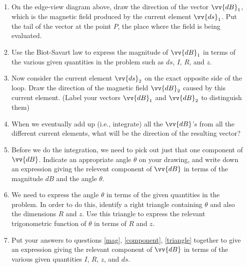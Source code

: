 \begin{enumerate}[leftmargin=0in, labelwidth=*, align=left, labelsep=0in, widest=a, itemindent=\labelwidth, label=(\emph{\alph*})]
\item On the edge-view diagram above, draw the direction of the vector $\vv{dB}_1$,
which is the magnetic field produced by the current element $\vv{ds}_1$.  Put the
tail of the vector at the point $P$, the place where the field
is being evaluated.  

\item \label{mag}
Use the Biot-Savart law to express the magnitude of $\vv{dB}_1$
in terms of the various given quantities in the problem such as $ds$, $I$,
$R$, and $z$.
\answerspace{0.7in}

\item Now consider the current element $\vv{ds}_2$ on the exact opposite
side of the loop.  Draw the direction of the magnetic field $\vv{dB}_2$
caused by this current element.  (Label your vectors $\vv{dB}_1$ and $\vv{dB}_2$ 
to distinguish them)

\item When we eventually add up (i.e., integrate) all the $\vv{dB}$'s from
all the different current elements, what will be the direction of  
the resulting
vector?
\answerspace{0.5in}

\item \label{component}
Before we do the integration, we need to pick out just that
one component of $\vv{dB}$.  Indicate an appropriate angle $\theta$
on your drawing, and write down an expression giving the
relevent component of $\vv{dB}$ in terms of the magnitude
$dB$ and the angle $\theta$.
\answerspace{0.5in}

\item \label{triangle}
We need to express the angle $\theta$ in terms of the given
quantities in the problem.  In order to do this, identify a right
triangle containing $\theta$ and also the dimensions $R$ and $z$.  Use this triangle
to express the relevant trigonometric function of $\theta$
in terms of $R$ and $z$.  
\answerspace{0.5in}

\item Put your answers to questions \ref{mag}, \ref{component},
\ref{triangle} together
to give an expression giving the relevant component of $\vv{dB}$
in terms of the various given quantities $I$, $R$, $z$, and $ds$.
\answerspace{0.5in}


\end{enumerate}
